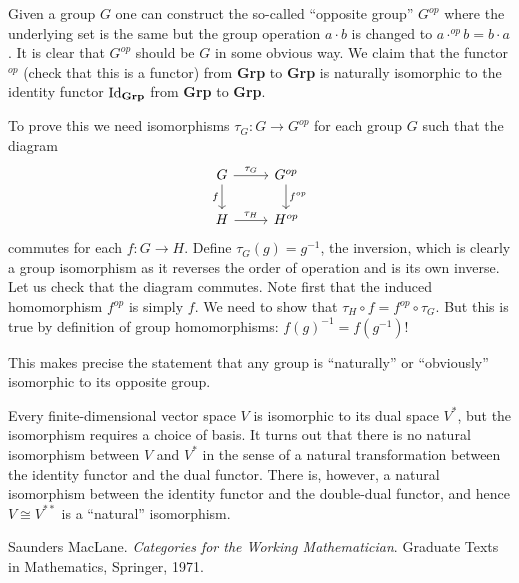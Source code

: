 \documentclass{../../mathnotes}
\begin{document}
\begin{exmp}
    Given a group $G$ one can construct the so-called ``opposite group'' $G^{op}$ where the underlying set is the same but
    the group operation $a\cdot b$ is changed to $a\cdot^{op}b=b\cdot a$. It is clear that $G^{op}$ should be $G$
    in some obvious way. We claim that the functor $^{op}$ (check that this is a functor) from \textbf{Grp} to \textbf{Grp} is naturally isomorphic to the
    identity functor $\operatorname{Id}_\text{\textbf{Grp}}$ from \textbf{Grp} to \textbf{Grp}.

    To prove this we need isomorphisms $\tau_G:G\to G^{op}$ for each group $G$ such that the diagram
    \begin{equation*}
        \begin{tikzcd}
            G\ar{r}{\tau_G}\ar[swap]{d}{f} & G^{op}\ar{d}{f^{op}}\\
            H\ar{r}{\tau_H} & H^{op}
        \end{tikzcd}
    \end{equation*}
    commutes for each $f:G\to H$. Define $\tau_G(g)=g^{-1}$, the inversion, which is clearly a group isomorphism
    as it reverses the order of operation and is its own inverse. Let us check that the diagram commutes. Note first
    that the induced homomorphism $f^{op}$ is simply $f$. We need to show that $\tau_H\circ f=f^{op}\circ\tau_G$.
    But this is true by definition of group homomorphisms: $f(g)^{-1}=f(g^{-1})$!

    This makes precise the statement that any group is ``naturally'' or ``obviously'' isomorphic to its opposite group.
\end{exmp}

\begin{exmp}
    Every finite-dimensional vector space $V$ is isomorphic to its dual space $V^*$, but the isomorphism requires a choice of basis.
    It turns out that there is no natural isomorphism between $V$ and $V^*$ in the sense of a natural transformation between
    the identity functor and the dual functor. There is, however, a natural isomorphism between the identity functor and the double-dual
    functor, and hence $V\cong V^{**}$ is a ``natural'' isomorphism.
\end{exmp}

\begin{thebibliography}{9}
        Saunders MacLane. \textit{Categories for the Working Mathematician}.
        Graduate Texts in Mathematics, Springer, 1971.
\end{thebibliography}
\end{document}
